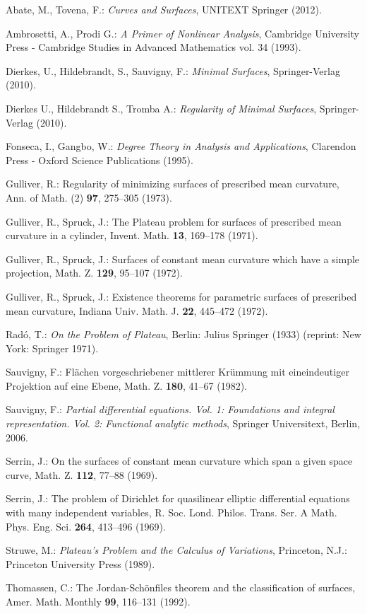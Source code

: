 \documentclass[a4paper,reqno,10pt,oneside]{amsart}
\numberwithin{equation}{section}
\begin{document}
 

\begin{thebibliography}{10}
Abate, M., Tovena, F.:
\emph{Curves and Surfaces}, UNITEXT Springer (2012).

Ambrosetti, A., Prodi G.:
\emph{A Primer of Nonlinear Analysis}, Cambridge University Press - Cambridge Studies in Advanced Mathematics vol. 34 (1993).

Dierkes, U., Hildebrandt, S., Sauvigny, F.:  
\emph{Minimal Surfaces}, Springer-Verlag (2010).

 Dierkes U., Hildebrandt S., Tromba A.: 
\emph{Regularity of Minimal Surfaces}, Springer-Verlag (2010).

Fonseca, I., Gangbo, W.:
\emph{Degree Theory in Analysis and Applications}, 
Clarendon Press - Oxford Science Publications (1995).

Gulliver, R.: 
Regularity of minimizing surfaces of prescribed mean curvature, 
Ann. of Math. (2) \textbf{97}, 275--305 (1973).

Gulliver, R., Spruck, J.: 
The Plateau problem for surfaces of prescribed mean curvature in a cylinder, 
Invent. Math. \textbf{13}, 169--178 (1971).

Gulliver, R., Spruck, J.: 
Surfaces of constant mean curvature which have a simple projection, 
Math. Z. \textbf{129}, 95--107 (1972).

Gulliver, R., Spruck, J.: 
Existence theorems for parametric surfaces of prescribed mean curvature, Indiana Univ. Math. J. \textbf{22}, 445--472 (1972).

Rad\'o, T.: 
\emph{On the Problem of Plateau}, Berlin: Julius Springer (1933) (reprint: New York: Springer 1971).

Sauvigny, F.: 
Fl\"achen vorgeschriebener mittlerer Kr\"ummung mit eineindeutiger Projektion auf eine Ebene, 
Math. Z. \textbf{180}, 41--67 (1982).

Sauvigny, F.: 
\emph{Partial differential equations. Vol. 1: Foundations and integral representation. Vol. 2: Functional analytic methods}, 
Springer Universitext, Berlin, 2006.

Serrin, J.:
On the surfaces of constant mean curvature which span a given space curve, Math. Z. \textbf{112}, 77--88 (1969).

Serrin, J.: 
The problem of Dirichlet for quasilinear elliptic differential equations with many independent variables,
R. Soc. Lond. Philos. Trans. Ser. A Math. Phys. Eng. Sci.
\textbf{264}, 413--496 (1969).

Struwe, M.: 
\emph{Plateau's Problem and the Calculus of Variations}, 
Princeton, N.J.: Princeton University Press (1989).

Thomassen, C.: 
The Jordan-Sch\"onfiles theorem and the classification of surfaces, 
Amer. Math. Monthly \textbf{99}, 116--131 (1992).
\end{thebibliography}
\end{document}
